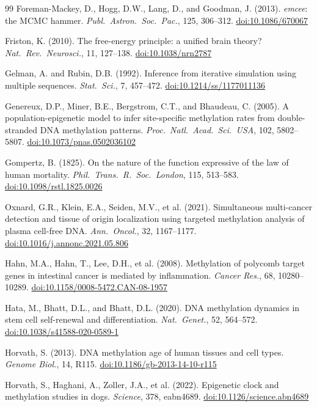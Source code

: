 \documentclass[12pt,a4paper]{article}
\newcommand{\doi}[1]{\href{https://doi.org/#1}{doi:#1}}
\begin{document}
\begin{thebibliography}{99}
Foreman-Mackey, D., Hogg, D.W., Lang, D., and Goodman, J. (2013).
\textit{emcee}: the MCMC hammer.
\textit{Publ.\ Astron.\ Soc.\ Pac.}, 125, 306--312.
\doi{10.1086/670067}

Friston, K. (2010).
The free-energy principle: a unified brain theory?
\textit{Nat.\ Rev.\ Neurosci.}, 11, 127--138.
\doi{10.1038/nrn2787}

Gelman, A. and Rubin, D.B. (1992).
Inference from iterative simulation using multiple sequences.
\textit{Stat.\ Sci.}, 7, 457--472.
\doi{10.1214/ss/1177011136}

Genereux, D.P., Miner, B.E., Bergstrom, C.T., and Bhaudeau, C. (2005).
A population-epigenetic model to infer site-specific methylation rates from double-stranded DNA methylation patterns.
\textit{Proc.\ Natl.\ Acad.\ Sci.\ USA}, 102, 5802--5807.
\doi{10.1073/pnas.0502036102}

Gompertz, B. (1825).
On the nature of the function expressive of the law of human mortality.
\textit{Phil.\ Trans.\ R.\ Soc.\ London}, 115, 513--583.
\doi{10.1098/rstl.1825.0026}

Oxnard, G.R., Klein, E.A., Seiden, M.V., et al. (2021).
Simultaneous multi-cancer detection and tissue of origin localization using targeted methylation analysis of plasma cell-free DNA.
\textit{Ann.\ Oncol.}, 32, 1167--1177.
\doi{10.1016/j.annonc.2021.05.806}

Hahn, M.A., Hahn, T., Lee, D.H., et al. (2008).
Methylation of polycomb target genes in intestinal cancer is mediated by inflammation.
\textit{Cancer Res.}, 68, 10280--10289.
\doi{10.1158/0008-5472.CAN-08-1957}

Hata, M., Bhatt, D.L., and Bhatt, D.L. (2020).
DNA methylation dynamics in stem cell self-renewal and differentiation.
\textit{Nat.\ Genet.}, 52, 564--572.
\doi{10.1038/s41588-020-0589-1}

Horvath, S. (2013).
DNA methylation age of human tissues and cell types.
\textit{Genome Biol.}, 14, R115.
\doi{10.1186/gb-2013-14-10-r115}

Horvath, S., Haghani, A., Zoller, J.A., et al. (2022).
Epigenetic clock and methylation studies in dogs.
\textit{Science}, 378, eabn4689.
\doi{10.1126/science.abn4689}


\end{thebibliography}
\end{document}
